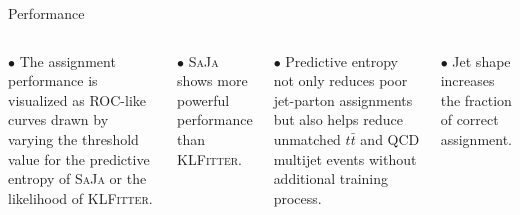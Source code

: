 \documentclass[10pt]{beamer}
\begin{document}

\begin{frame}[fragile]{Performance}

    \begin{columns}
        \medskip
        
        {\footnotesize $\bullet$ The assignment performance is visualized as ROC-like curves drawn by varying the threshold value for the predictive entropy of \textsc{SaJa} or the likelihood of \textsc{KLFitter}.}
        
        {\footnotesize $\bullet$  \textsc{SaJa} shows more powerful performance than \textsc{KLFitter}.}
        
        {\footnotesize $\bullet$ Predictive entropy not only reduces poor jet-parton assignments but also helps reduce unmatched $t\bar{t}$ and QCD multijet events without additional training process.}
        
        {\footnotesize $\bullet$  Jet shape increases the fraction of correct assignment.}
        

\end{columns}
\end{frame}
\end{document}
